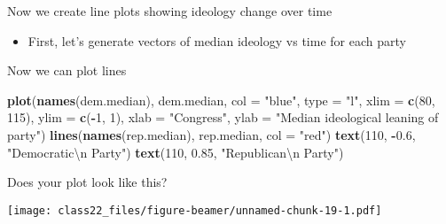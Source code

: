 \documentclass[ignorenonframetext,]{beamer}
\newenvironment{Shaded}{\begin{snugshade}}{\end{snugshade}}
\newcommand{\KeywordTok}[1]{\textcolor[rgb]{0.13,0.29,0.53}{\textbf{#1}}}
\newcommand{\DataTypeTok}[1]{\textcolor[rgb]{0.13,0.29,0.53}{#1}}
\newcommand{\DecValTok}[1]{\textcolor[rgb]{0.00,0.00,0.81}{#1}}
\newcommand{\FloatTok}[1]{\textcolor[rgb]{0.00,0.00,0.81}{#1}}
\newcommand{\CharTok}[1]{\textcolor[rgb]{0.31,0.60,0.02}{#1}}
\newcommand{\StringTok}[1]{\textcolor[rgb]{0.31,0.60,0.02}{#1}}
\newcommand{\CommentTok}[1]{\textcolor[rgb]{0.56,0.35,0.01}{\textit{#1}}}
\newcommand{\OperatorTok}[1]{\textcolor[rgb]{0.81,0.36,0.00}{\textbf{#1}}}
\newcommand{\NormalTok}[1]{#1}
\providecommand{\tightlist}{%
	\setlength{\itemsep}{0pt}\setlength{\parskip}{0pt}}
\begin{document}
\begin{frame}[fragile]{Now we create line plots showing ideology change
over time}

\begin{itemize}
\tightlist
\item
  First, let's generate vectors of median ideology vs time for each
  party
\end{itemize}

\begin{Shaded}
\end{Shaded}

\end{frame}

\begin{frame}[fragile]{Now we can plot lines}

\begin{Shaded}
\begin{Highlighting}[]
\KeywordTok{plot}\NormalTok{(}\KeywordTok{names}\NormalTok{(dem.median), dem.median, }
     \DataTypeTok{col =} \StringTok{"blue"}\NormalTok{, }
     \DataTypeTok{type =} \StringTok{"l"}\NormalTok{,}
     \DataTypeTok{xlim =} \KeywordTok{c}\NormalTok{(}\DecValTok{80}\NormalTok{, }\DecValTok{115}\NormalTok{), }
     \DataTypeTok{ylim =} \KeywordTok{c}\NormalTok{(}\OperatorTok{-}\DecValTok{1}\NormalTok{, }\DecValTok{1}\NormalTok{), }
     \DataTypeTok{xlab =} \StringTok{"Congress"}\NormalTok{,}
     \DataTypeTok{ylab =} \StringTok{"Median ideological leaning of party"}\NormalTok{)}
\KeywordTok{lines}\NormalTok{(}\KeywordTok{names}\NormalTok{(rep.median), rep.median, }\DataTypeTok{col =} \StringTok{"red"}\NormalTok{)}
\KeywordTok{text}\NormalTok{(}\DecValTok{110}\NormalTok{, }\OperatorTok{-}\FloatTok{0.6}\NormalTok{, }\StringTok{"Democratic}\CharTok{\textbackslash{}n}\StringTok{ Party"}\NormalTok{)}
\KeywordTok{text}\NormalTok{(}\DecValTok{110}\NormalTok{, }\FloatTok{0.85}\NormalTok{, }\StringTok{"Republican}\CharTok{\textbackslash{}n}\StringTok{ Party"}\NormalTok{)}
\end{Highlighting}
\end{Shaded}

\end{frame}

\begin{frame}{Does your plot look like this?}

\texttt{[image: class22\_files/figure-beamer/unnamed-chunk-19-1.pdf]}

\end{frame}
\end{document}
